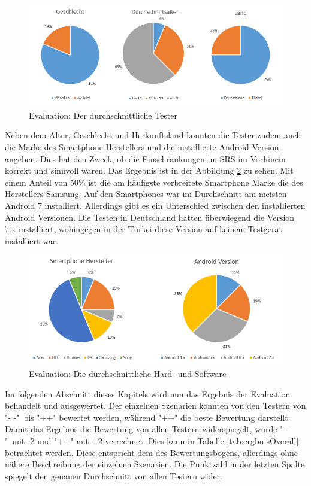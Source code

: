 				\begin{figure}[htbp]
					\centering 
					\label{auswertungTester}
					\includegraphics[width=\textwidth]{pics/TesterAuswertung.png}
					\caption{Evaluation: Der durchschnittliche Tester}
				\end{figure}

				Neben dem Alter, Geschlecht und Herkunftsland konnten die Tester zudem auch die Marke des Smartphone-Herstellers und die installierte Android Version angeben. Dies hat den Zweck, ob die Einschränkungen im \ac{SRS} im Vorhinein korrekt und sinnvoll waren. Das Ergebnis ist in der Abbildung \ref{auswertungSmartphones} zu sehen. Mit einem Anteil von 50\% ist die am häufigste verbreitete Smartphone Marke die des Herstellers Samsung. Auf den Smartphones war im Durchschnitt am meisten Android 7 installiert. Allerdings gibt es ein Unterschied zwischen den installierten Android Versionen. Die Testen in Deutschland hatten überwiegend die Version 7.x installiert, wohingegen in der Türkei diese Version auf keinem Testgerät installiert war.

				\begin{figure}[htbp]
					\centering 
					\label{auswertungSmartphones}
					\includegraphics[width=\textwidth]{pics/SmartphoneAuswertung.png}
					\caption{Evaluation: Die durchschnittliche Hard- und Software}
				\end{figure}

				Im folgenden Abschnitt dieses Kapitels wird nun das Ergebnis der Evaluation behandelt und ausgewertet. Der einzelnen Szenarien konnten von den Testern von "\-- -"\ bis "++" bewertet werden, während "++" die beste Bewertung darstellt. Damit das Ergebnis die Bewertung von allen Testern widerspiegelt, wurde "\-- -"\ mit -2 und "++" mit +2 verrechnet. Dies kann in Tabelle \ref{tab:ergbnisOverall} betrachtet werden. Diese entspricht dem des Bewertungsbogens, allerdings ohne nähere Beschreibung der einzelnen Szenarien. Die Punktzahl in der letzten Spalte spiegelt den genauen Durchschnitt von allen Testern wider.

